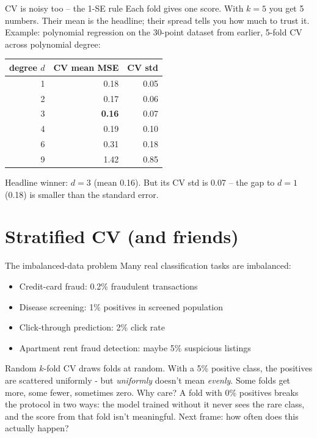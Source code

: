\documentclass[aspectratio=169]{beamer}
\begin{document}
\begin{frame}{CV is noisy too -- the 1-SE rule}
  Each fold gives one score. With $k = 5$ you get 5 numbers. Their mean is the headline; their spread tells you how much to trust it.
  \vfill
  Example: polynomial regression on the 30-point dataset from earlier, 5-fold CV across polynomial degree:
  \vskip 4pt
  \begin{center}\small
    \begin{tabular}{r r r}
      \textbf{degree $d$} & \textbf{CV mean MSE} & \textbf{CV std} \\
      \hline
      1 & 0.18 & 0.05 \\
      2 & 0.17 & 0.06 \\
      3 & \textbf{0.16} & 0.07 \\
      4 & 0.19 & 0.10 \\
      6 & 0.31 & 0.18 \\
      9 & 1.42 & 0.85 \\
    \end{tabular}
  \end{center}
  \vfill
  Headline winner: $d = 3$ (mean 0.16). But its CV std is 0.07 -- the gap to $d = 1$ (0.18) is smaller than the standard error.
  \vfill
\end{frame}

\section{Stratified CV (and friends)}

\begin{frame}{The imbalanced-data problem}
  Many real classification tasks are imbalanced:
  \begin{itemize}
    \item Credit-card fraud: 0.2\% fraudulent transactions
    \item Disease screening: 1\% positives in screened population
    \item Click-through prediction: 2\% click rate
    \item Apartment rent fraud detection: maybe 5\% suspicious listings
  \end{itemize}
  \vfill
  Random $k$-fold CV draws folds at random. With a 5\% positive class, the positives are scattered uniformly - but \emph{uniformly} doesn't mean \emph{evenly}. Some folds get more, some fewer, sometimes zero.
  \vfill
  Why care? A fold with 0\% positives breaks the protocol in two ways: the model trained without it never sees the rare class, and the score from that fold isn't meaningful.
  \vfill
  Next frame: how often does this actually happen?
\end{frame}
\end{document}
